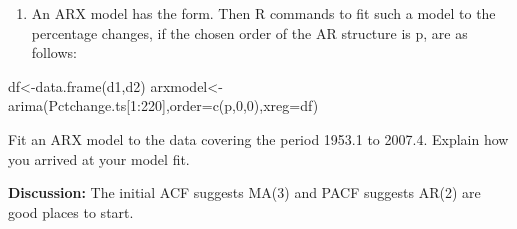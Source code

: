 \documentclass[
]{article}
\newenvironment{Shaded}{\begin{snugshade}}{\end{snugshade}}
\newcommand{\DecValTok}[1]{\textcolor[rgb]{0.00,0.00,0.81}{#1}}
\newcommand{\FunctionTok}[1]{\textcolor[rgb]{0.00,0.00,0.00}{#1}}
\newcommand{\NormalTok}[1]{#1}
\newcommand{\OtherTok}[1]{\textcolor[rgb]{0.56,0.35,0.01}{#1}}
\newcommand{\SpecialCharTok}[1]{\textcolor[rgb]{0.00,0.00,0.00}{#1}}
\providecommand{\tightlist}{%
  \setlength{\itemsep}{0pt}\setlength{\parskip}{0pt}}
\begin{document}
\begin{Shaded}
\end{Shaded}

\begin{enumerate}
\def\labelenumi{(\roman{enumi})}
\setcounter{enumi}{2}
\tightlist
\item
  An ARX model has the form. Then R commands to fit such a model to the
  percentage changes, if the chosen order of the AR structure is p, are
  as follows:
\end{enumerate}

df\textless-data.frame(d1,d2)
arxmodel\textless-arima(Pctchange.ts{[}1:220{]},order=c(p,0,0),xreg=df)

Fit an ARX model to the data covering the period 1953.1 to 2007.4.
Explain how you arrived at your model fit.

\textbf{Discussion:} The initial ACF suggests MA(3) and PACF suggests
AR(2) are good places to start.

\begin{Shaded}
\end{Shaded}
\end{document}
